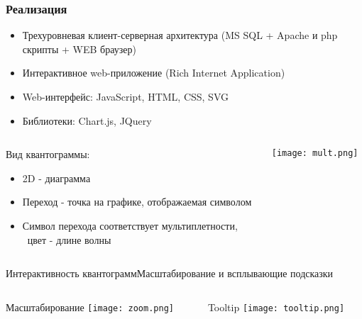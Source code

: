 \documentclass{beamer}
\begin{document}
\begin{frame}
\frametitle{Реализация}
    \begin{itemize}
        \item Трехуровневая клиент-серверная архитектура (MS SQL + Apache и php скрипты + WEB браузер)
        \item Интерактивное web-приложение (Rich Internet Application)
        \item Web-интерфейс: JavaScript, HTML, CSS, SVG
        \item Библиотеки: Chart.js, JQuery
    \end{itemize}
    \begin{columns}
    \begin{column}{0.7\textwidth}
       Вид квантограммы:
    \begin{itemize}
        \item 2D - диаграмма
        \item Переход - точка на графике, отображаемая символом
        \item Символ перехода соответствует мультиплетности, 
        \\~цвет - длине волны
    \end{itemize}
    \end{column}
    \begin{column}{0.25\textwidth}
      \texttt{[image: mult.png]}
    \end{column}
  \end{columns}
\end{frame}

\begin{frame}{Интерактивность квантограмм}{Масштабирование и всплывающие подсказки}
    \begin{columns}
    \begin{column}{0.5\textwidth}
         Масштабирование
         \texttt{[image: zoom.png]}
    \end{column}
    \begin{column}{0.5\textwidth}
      Tooltip
      \texttt{[image: tooltip.png]}
    \end{column}
  \end{columns}
\end{frame}
\end{document}
